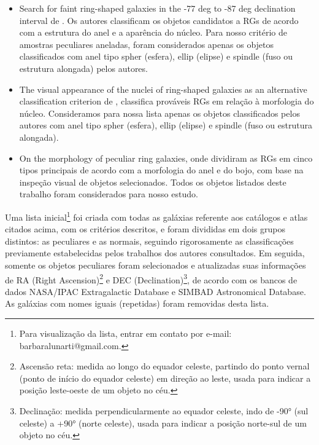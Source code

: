 \begin{itemize}
    \item Search for faint ring-shaped galaxies in the -77 deg to -87 deg declination interval de . Os autores classificam os objetos candidatos a RGs de acordo com a estrutura do anel e a aparência do núcleo. Para nosso critério de amostras peculiares aneladas, foram considerados apenas os objetos classificados com anel tipo spher (esfera), ellip (elipse) e spindle (fuso ou estrutura alongada) pelos autores.
    \item The visual appearance of the nuclei of ring-shaped galaxies as an alternative classification criterion de , classifica prováveis RGs em relação à morfologia do núcleo. Consideramos para nossa lista apenas os objetos classificados pelos autores com anel tipo spher (esfera), ellip (elipse) e spindle (fuso ou estrutura alongada).
    \item On the morphology of peculiar ring galaxies, onde  dividiram as RGs em cinco tipos principais de acordo com a morfologia do anel e do bojo, com base na inspeção visual de objetos selecionados. Todos os objetos listados deste trabalho foram considerados para nosso estudo.
\end{itemize}

Uma lista inicial\footnote{Para visualização da lista, entrar em contato por e-mail: barbaralunarti@gmail.com.} foi criada com todas as galáxias referente aos catálogos e atlas citados acima, com os critérios descritos, e foram divididas em dois grupos distintos: as peculiares e as normais, seguindo rigorosamente as classificações previamente estabelecidas pelos trabalhos dos autores consultados. Em seguida, somente os objetos peculiares foram selecionados e atualizadas suas informações de RA (Right Ascension)\footnote{Ascensão reta: medida ao longo do equador celeste, partindo do ponto vernal (ponto de início do equador celeste) em direção ao leste, usada para indicar a posição leste-oeste de um objeto no céu.} e DEC (Declination)\footnote{Declinação: medida perpendicularmente ao equador celeste, indo de -90° (sul celeste) a +90° (norte celeste), usada para indicar a posição norte-sul de um objeto no céu.}, de acordo com os bancos de dados NASA/IPAC Extragalactic Database e SIMBAD Astronomical Database. As galáxias com nomes iguais (repetidas) foram removidas desta lista.

